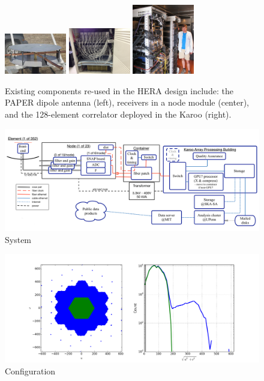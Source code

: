 \documentclass[ars]{copernicus}
\begin{document}
\begin{figure}[t]
        \includegraphics[width=2.7cm]{plots/new_antenna_closeup.jpg}
        \includegraphics[width=2.7cm]{plots/recv_node.png}
        \includegraphics[width=2.7cm]{plots/digital.png}
    \caption{\small
    Existing components re-used in the HERA design include:
    the PAPER dipole antenna (left), 
    receivers in a node module (center), and
    the 128-element correlator deployed in the Karoo (right).}
\label{fig:components}
\end{figure}


\begin{figure}[t]
\includegraphics[width=12cm]{plots/HERA_high_level_block_diagram.png}
\caption{System}
\label{fig:systemOverview}
\end{figure}

\begin{figure}[t]
\includegraphics[width=12cm]{plots/config.png}
\caption{Configuration}
\label{fig:config}
\end{figure}
\end{document}
